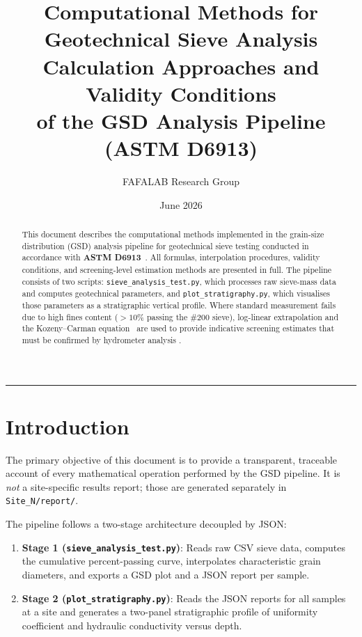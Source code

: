 \documentclass[12pt,a4paper]{article}
\title{%
  \textbf{Computational Methods for Geotechnical Sieve Analysis}\\[6pt]
  \large Calculation Approaches and Validity Conditions\\
  of the GSD Analysis Pipeline (ASTM D6913)
}
\author{FAFALAB Research Group}
\date{June 2026}
\begin{document}
\maketitle
\tableofcontents
\bigskip\hrule\bigskip

\begin{abstract}
This document describes the computational methods implemented in the
grain-size distribution (GSD) analysis pipeline for geotechnical sieve
testing conducted in accordance with \textbf{ASTM D6913}~\citep{astm_d6913}.
All formulas, interpolation procedures, validity conditions, and screening-level
estimation methods are presented in full.
The pipeline consists of two scripts: \texttt{sieve\_analysis\_test.py}, which
processes raw sieve-mass data and computes geotechnical parameters, and
\texttt{plot\_stratigraphy.py}, which visualises those parameters as a
stratigraphic vertical profile.
Where standard measurement fails due to high fines content (\(>10\%\) passing
the \#200 sieve), log-linear extrapolation and the Kozeny--Carman
equation~\citep{kozeny1927, carman1937} are used to provide indicative
screening estimates that must be confirmed by hydrometer analysis
\citep{astm_d7928}.
\end{abstract}

\section{Introduction}

The primary objective of this document is to provide a transparent, traceable
account of every mathematical operation performed by the GSD pipeline.
It is \emph{not} a site-specific results report; those are generated separately
in \texttt{Site\_N/report/}.

The pipeline follows a two-stage architecture decoupled by JSON:
\begin{enumerate}
    \item \textbf{Stage 1 (\texttt{sieve\_analysis\_test.py})}: Reads raw CSV
          sieve data, computes the cumulative percent-passing curve, interpolates
          characteristic grain diameters, and exports a GSD plot and a JSON
          report per sample.
    \item \textbf{Stage 2 (\texttt{plot\_stratigraphy.py})}: Reads the JSON
          reports for all samples at a site and generates a two-panel
          stratigraphic profile of uniformity coefficient and hydraulic
          conductivity versus depth.
\end{enumerate}
\end{document}
